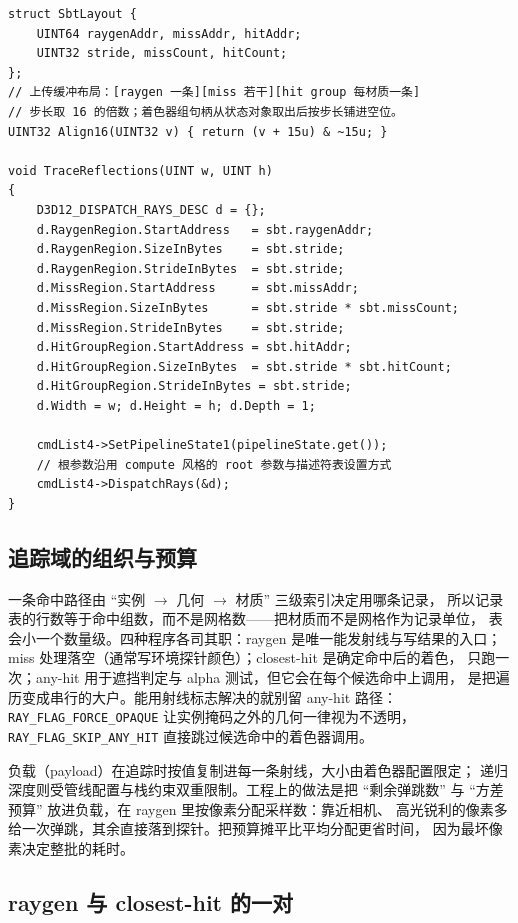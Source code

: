 \documentclass[12pt,a4paper,fontset=fandol]{ctexbook}
\newcommand{\Tp}[1]{\texttt{#1}}
\begin{document}
\begin{lstlisting}[style=cppstyle,caption={记录表布局与批量发射：步长按 16 字节对齐，命中区按材质展开},label={lst:ch13-sbt}]
struct SbtLayout {
    UINT64 raygenAddr, missAddr, hitAddr;
    UINT32 stride, missCount, hitCount;
};
// 上传缓冲布局：[raygen 一条][miss 若干][hit group 每材质一条]
// 步长取 16 的倍数；着色器组句柄从状态对象取出后按步长铺进空位。
UINT32 Align16(UINT32 v) { return (v + 15u) & ~15u; }

void TraceReflections(UINT w, UINT h)
{
    D3D12_DISPATCH_RAYS_DESC d = {};
    d.RaygenRegion.StartAddress   = sbt.raygenAddr;
    d.RaygenRegion.SizeInBytes    = sbt.stride;
    d.RaygenRegion.StrideInBytes  = sbt.stride;
    d.MissRegion.StartAddress     = sbt.missAddr;
    d.MissRegion.SizeInBytes      = sbt.stride * sbt.missCount;
    d.MissRegion.StrideInBytes    = sbt.stride;
    d.HitGroupRegion.StartAddress = sbt.hitAddr;
    d.HitGroupRegion.SizeInBytes  = sbt.stride * sbt.hitCount;
    d.HitGroupRegion.StrideInBytes = sbt.stride;
    d.Width = w; d.Height = h; d.Depth = 1;

    cmdList4->SetPipelineState1(pipelineState.get());
    // 根参数沿用 compute 风格的 root 参数与描述符表设置方式
    cmdList4->DispatchRays(&d);
}
\end{lstlisting}

\subsection{追踪域的组织与预算}

一条命中路径由 ``实例 \(\to\) 几何 \(\to\) 材质'' 三级索引决定用哪条记录，
所以记录表的行数等于命中组数，而不是网格数------把材质而不是网格作为记录单位，
表会小一个数量级。四种程序各司其职：raygen 是唯一能发射线与写结果的入口；
miss 处理落空（通常写环境探针颜色）；closest-hit 是确定命中后的着色，
只跑一次；any-hit 用于遮挡判定与 alpha 测试，但它会在每个候选命中上调用，
是把遍历变成串行的大户。能用射线标志解决的就别留 any-hit 路径：
\Tp{RAY\_FLAG\_FORCE\_OPAQUE} 让实例掩码之外的几何一律视为不透明，
\Tp{RAY\_FLAG\_SKIP\_ANY\_HIT} 直接跳过候选命中的着色器调用。

负载（payload）在追踪时按值复制进每一条射线，大小由着色器配置限定；
递归深度则受管线配置与栈约束双重限制。工程上的做法是把 ``剩余弹跳数''
与 ``方差预算'' 放进负载，在 raygen 里按像素分配采样数：靠近相机、
高光锐利的像素多给一次弹跳，其余直接落到探针。把预算摊平比平均分配更省时间，
因为最坏像素决定整批的耗时。

\subsection{raygen 与 closest-hit 的一对}
\end{document}
